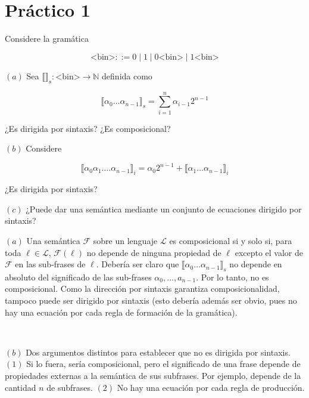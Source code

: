 \documentclass[article, 12pt]{article}
\begin{document}
\pagebreak
\section{Práctico 1}

\begin{myframe}
  Considere la gramática 

  \begin{equation*}
    \text{<bin>} ::= 0 \mid 1 \mid 0\text{<bin>} \mid 1\text{<bin>}
  \end{equation*}

  $(a)$ Sea $\llbracket  \rrbracket_s : \text{<bin>} \to \mathbb{N}$ definida
  como 

  \begin{equation*}
    \llbracket \alpha_0\ldots\alpha_{n-1} \rrbracket_{s} = \sum_{i=1}^n
    \alpha_{i-1}2^{n-1}
  \end{equation*}

  ¿Es dirigida por sintaxis? ¿Es composicional? 

  $(b)$ Considere 

  \begin{equation*}
    \llbracket \alpha_0 \alpha_1 \ldots. \alpha_{n-1} \rrbracket_i =
    \alpha_{0} 2^{n-1} + \llbracket \alpha_1 \ldots \alpha_{n-1} \rrbracket_i
  \end{equation*}

  ¿Es dirigida por sintaxis? 

  $(c)$ ¿Puede dar una semántica mediante un conjunto de ecuaciones dirigido por
  sintaxis?
\end{myframe}

$(a)$ Una semántica $\mathcal{F}$ sobre un lenguaje $\mathcal{L}$ es
composicional si y solo si, para toda $\ell \in \mathcal{L}$, $\mathcal{F}(\ell)$
no depende de ninguna propiedad de $\ell$ excepto el valor de $\mathcal{F}$ en
las sub-frases de $\ell$. Debería ser claro que $\llbracket
\alpha_0\ldots\alpha_{n-1} \rrbracket_s$ no
depende en absoluto del significado de las sub-frases $\alpha_0, \ldots,
a_{n-1}$. Por lo tanto, no es composicional. Como la dirección por sintaxis
garantiza composicionalidad, tampoco puede ser dirigido por sintaxis (esto
debería además ser obvio, pues no hay una ecuación por cada regla de formación
de la gramática).

~

$(b)$ Dos argumentos distintos para establecer que no es dirigida por sintaxis.
$(1)$ Si lo fuera, sería composicional, pero el significado de una frase depende
de propiedades externas a la semántica de sus subfrases. Por ejemplo, depende de
la cantidad $n$ de subfrases. $(2)$ No hay una ecuación por cada regla de
producción.
\end{document}
